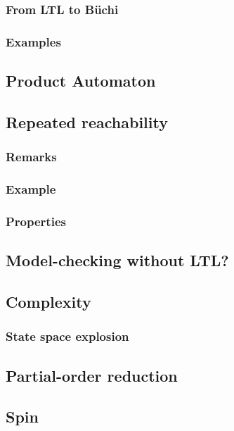 \documentclass[12pt, a4paper]{book}
\begin{document}
  \subsubsection{From LTL to Büchi}
  \label{subs:From LTL to Büchi}
  \subsubsection{Examples}
  \label{subs:Examples}
  \subsection{Product Automaton}
  \label{sub:Product Automaton}
  \subsection{Repeated reachability}
  \label{sub:Repeated reachability}
  \subsubsection{Remarks}
  \label{subs:Remarks}
  \subsubsection{Example}
  \label{subs:Example}
  \subsubsection{Properties}
  \label{subs:Properties}
  \subsection{Model-checking without LTL?}
  \label{sub:Model-checking without LTL?}
  \subsection{Complexity}
  \label{sub:Complexity}
  \subsubsection{State space explosion}
  \label{subs:State space explosion}
  \subsection{Partial-order reduction}
  \label{sub:Partial-order reduction}
  \subsection{Spin}
  \label{sub:Spin}
\end{document}
